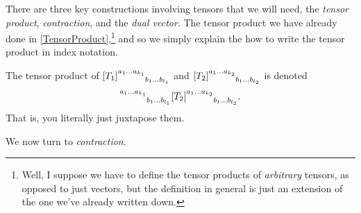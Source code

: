 There are three key constructions involving tensors that we will need, the \emph{tensor product}, \emph{contraction}, and the \emph{dual vector}.  The tensor product we have already done in \cref{TensorProduct},\footnote{Well, I suppose we have to define the tensor products of \emph{arbitrary} tensors, as opposed to just vectors, but the definition in general is just an extension of the one we've already written down.} and so we simply explain the how to write the tensor product in index notation.
\begin{displayquote}
The tensor product of $[T_1]\indices{^{a_1\ldots a_{k_1}}_{b_1\ldots b_{l_1}}}$ and $[T_2]\indices{^{a_1\ldots a_{k_2}}_{b_1\ldots b_{l_2}}}$ is denoted
\begin{equation}
[T_1]\indices{^{a_1\ldots a_{k_1}}_{b_1\ldots b_{l_1}}}[T_2]\indices{^{a_1\ldots a_{k_2}}_{b_1\ldots b_{l_2}}}.
\end{equation}
That is, you literally just juxtapose them.
\end{displayquote}
We now turn to \emph{contraction}.
